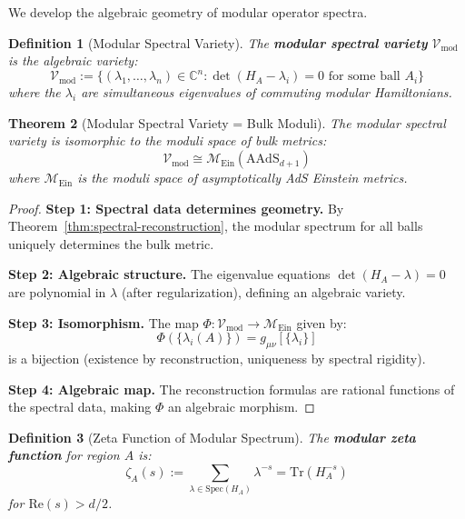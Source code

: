 \documentclass[12pt,a4paper]{article}
\newtheorem{theorem}{Theorem}[section]
\newtheorem{definition}[theorem]{Definition}
\begin{document}
We develop the algebraic geometry of modular operator spectra.

\begin{definition}[Modular Spectral Variety]\label{def:mod-spectral-variety}
The \textbf{modular spectral variety} $\mathcal{V}_{\text{mod}}$ is the algebraic variety:
\begin{equation}
\mathcal{V}_{\text{mod}} := \{ (\lambda_1, \ldots, \lambda_n) \in \mathbb{C}^n : \det(H_A - \lambda_i) = 0 \text{ for some ball } A_i \}
\end{equation}
where the $\lambda_i$ are simultaneous eigenvalues of commuting modular Hamiltonians.
\end{definition}

\begin{theorem}[Modular Spectral Variety = Bulk Moduli]\label{thm:spectral-variety-moduli}
The modular spectral variety is isomorphic to the moduli space of bulk metrics:
\begin{equation}
\mathcal{V}_{\text{mod}} \cong \mathcal{M}_{\text{Ein}}(\text{AAdS}_{d+1})
\end{equation}
where $\mathcal{M}_{\text{Ein}}$ is the moduli space of asymptotically AdS Einstein metrics.
\end{theorem}

\begin{proof}
\textbf{Step 1: Spectral data determines geometry.} By Theorem~\ref{thm:spectral-reconstruction}, the modular spectrum for all balls uniquely determines the bulk metric.

\textbf{Step 2: Algebraic structure.} The eigenvalue equations $\det(H_A - \lambda) = 0$ are polynomial in $\lambda$ (after regularization), defining an algebraic variety.

\textbf{Step 3: Isomorphism.} The map $\Phi: \mathcal{V}_{\text{mod}} \to \mathcal{M}_{\text{Ein}}$ given by:
\begin{equation}
\Phi(\{\lambda_i(A)\}) = g_{\mu\nu}[\{\lambda_i\}]
\end{equation}
is a bijection (existence by reconstruction, uniqueness by spectral rigidity).

\textbf{Step 4: Algebraic map.} The reconstruction formulas are rational functions of the spectral data, making $\Phi$ an algebraic morphism.
\end{proof}

\begin{definition}[Zeta Function of Modular Spectrum]\label{def:modular-zeta}
The \textbf{modular zeta function} for region $A$ is:
\begin{equation}
\zeta_A(s) := \sum_{\lambda \in \text{Spec}(H_A)} \lambda^{-s} = \text{Tr}(H_A^{-s})
\end{equation}
for $\text{Re}(s) > d/2$.
\end{definition}
\end{document}
